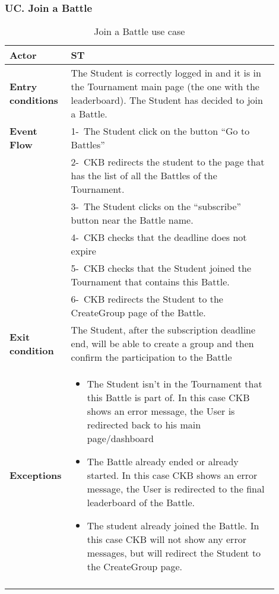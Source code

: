 \subsubsection*{UC\cuc . Join a Battle}
\begin{center}
    \begin{longtable}{|l|p{0.9\linewidth}|}
        \hline
        \textbf{Actor}            & ST                                                                                                                                                                                        \\
        \hline
        \textbf{Entry conditions} & The Student is correctly logged in and it is in the Tournament main page (the one with the leaderboard). The Student has decided to join a Battle.        \\
        \hline
        \textbf{Event Flow}       & 1-\ The Student click on the button “Go to Battles”        \\
        & 2-\ CKB redirects the student to the page that has the list of all the Battles of the Tournament.        \\
        & 3-\ The Student clicks on the “subscribe” button near the Battle name.        \\
        & 4-\ CKB checks that the deadline does not expire\\
        & 5-\ CKB checks that the Student joined the Tournament that contains this Battle.        \\
        & 6-\ CKB redirects the Student to the CreateGroup page of the Battle.        \\
        \hline
        \textbf{Exit condition}   & The Student, after the subscription deadline end, will be able to create a group and then confirm the participation to the Battle        \\
        \hline
        \textbf{Exceptions}        & \begin{itemize}
            \item The Student isn’t in the Tournament that this Battle is part of. In this case CKB shows an error message, the User is redirected back to his main page/dashboard
            \item The Battle already ended or already started. In this case  CKB shows an error message, the User is redirected to the final leaderboard of the Battle.
            \item The student already joined the Battle. In this case CKB will not show any error messages, but will redirect the Student to the CreateGroup page.
         \end{itemize}    \\
        \hline
        \caption{Join a Battle use case}
        \label{tab: join_a_Battle_use_case}
    \end{longtable}
\end{center}

